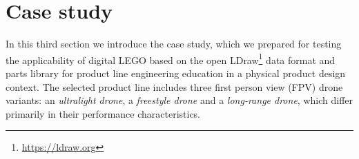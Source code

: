 \documentclass[sigconf,review,anonymous]{acmart}
\begin{document}
\section{Case study}
\label{sec:case-study}

In this third section we introduce the case study, which we prepared for testing the applicability of digital LEGO based on the open LDraw\footnote{\url{https://ldraw.org}} data format and parts library for product line engineering education in a physical product design context.
The selected product line includes three first person view (FPV) drone variants: an \textit{ultralight drone}, a \textit{freestyle drone} and a \textit{long-range drone}, which differ primarily in their performance characteristics.

\begin{figure}[tbp]
    \hfill
    \hfill
    \hfill
    \hfill
    \hfill


\end{figure}
\end{document}
